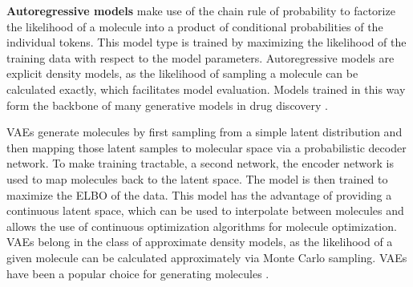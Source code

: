 \textbf{Autoregressive models} make use of the chain rule of probability to factorize the likelihood
of a molecule into a product of conditional probabilities of the individual tokens. This model type
is trained by maximizing the likelihood of the training data with respect to the model parameters.
Autoregressive models are explicit density models, as the likelihood of sampling a molecule can be
calculated exactly, which facilitates model evaluation. Models trained in this way form the backbone
of many generative models in drug discovery
\citep{gomez-bombarelliAutomaticChemicalDesign2018,seglerGeneratingFocusedMolecule2018,olivecronaMolecularDenovoDesign2017,guoAugmentedMemoryCapitalizing2023,thomasAugmentedHillClimbIncreases2022,jaquesSequenceTutorConservative2016,cohen-karlikOvercomingOrderAutoregressive2024}.

\Acp{VAE} \citep{kingmaAutoEncodingVariationalBayes2013} generate molecules by first sampling from a
simple latent distribution and then mapping those latent samples to molecular space via a
probabilistic decoder network. To make training tractable, a second network, the encoder network is
used to map molecules back to the latent space. The model is then trained to maximize the \ac{ELBO}
of the data.
This model has the advantage of providing a continuous latent space, which can be used to
interpolate between molecules and allows the use of continuous optimization algorithms for molecule
optimization. \acp{VAE} belong in the class of approximate density models, as the likelihood of a given
molecule can be calculated approximately via Monte Carlo sampling. \acp{VAE} have been a popular choice
for generating molecules
\citep{gomez-bombarelliAutomaticChemicalDesign2018,kusnerGrammarVariationalAutoencoder2017,simonovskyGraphVAEGenerationSmall2018,samantaNeVAEDeepGenerative2018,jinJunctionTreeVariational2018,daiSyntaxDirectedVariationalAutoencoder2018,liuConstrainedGraphVariational2018}.

